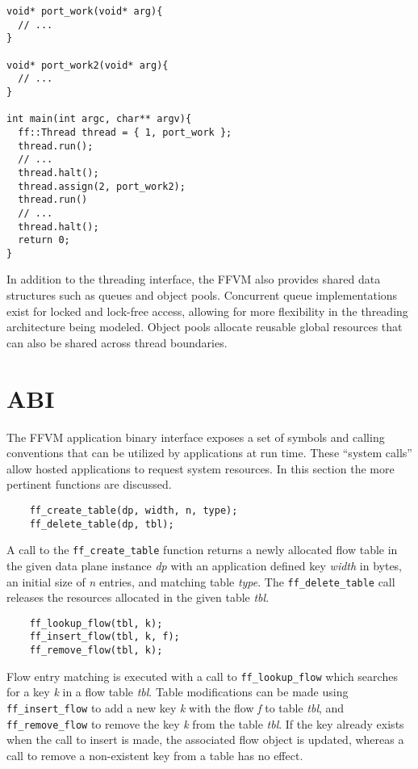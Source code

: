 \begin{lstlisting}
void* port_work(void* arg){
  // ...
}

void* port_work2(void* arg){
  // ...
}

int main(int argc, char** argv){
  ff::Thread thread = { 1, port_work };
  thread.run();
  // ...
  thread.halt();
  thread.assign(2, port_work2);
  thread.run()
  // ...
  thread.halt();
  return 0;
}
\end{lstlisting}

In addition to the threading interface, the FFVM also provides shared data
structures such as queues and object pools. Concurrent queue implementations
exist for locked and lock-free access, allowing for more flexibility in the
threading architecture being modeled. Object pools allocate reusable global
resources that can also be shared across thread boundaries.

\section{ABI}
\label{vm:abi}
The FFVM application binary interface exposes a set of symbols and calling
conventions that can be utilized by applications at run time. These ``system
calls'' allow hosted applications to request system resources. In this section
the more pertinent functions are discussed.

\begin{lstlisting}
    ff_create_table(dp, width, n, type);
    ff_delete_table(dp, tbl);
\end{lstlisting}

A call to the \texttt{ff\_create\_table} function returns a newly allocated
flow table in the given data plane instance \emph{dp} with an application
defined key \emph{width} in bytes, an initial size of \emph{n} entries, and
matching table \emph{type}. The \texttt{ff\_delete\_table} call releases the
resources allocated in the given table \emph{tbl}.

\begin{lstlisting}
    ff_lookup_flow(tbl, k);
    ff_insert_flow(tbl, k, f);
    ff_remove_flow(tbl, k);
\end{lstlisting}

Flow entry matching is executed with a call to \texttt{ff\_lookup\_flow} which
searches for a key \emph{k} in a flow table \emph{tbl}. Table modifications can
be made using \texttt{ff\_insert\_flow} to add a new key \emph{k} with the
flow \emph{f} to table \emph{tbl}, and \texttt{ff\_remove\_flow} to remove the
key \emph{k} from the table \emph{tbl}. If the key already exists when the call
to insert is made, the associated flow object is updated, whereas a call to
remove a non-existent key from a table has no effect.

